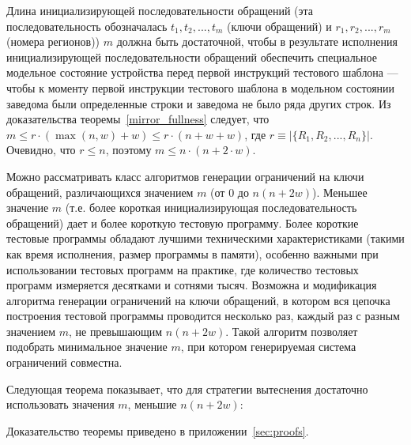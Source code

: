 Длина инициализирующей последовательности обращений (эта последовательность обозначалась $t_1, t_2, ..., t_m$ (ключи обращений) и $r_1, r_2, ..., r_m$ (номера регионов)) $m$ должна быть достаточной, чтобы в результате исполнения инициализирующей последовательности обращений обеспечить специальное модельное состояние устройства перед первой инструкций тестового шаблона --- чтобы к моменту первой инструкции тестового шаблона в модельном состоянии заведома были определенные строки и заведома не было ряда других строк. Из доказательства теоремы~\ref{mirror_fullness} следует, что $m \leqslant r \cdot (\max(n,w) + w) \leqslant r \cdot (n + w + w)$, где $r \equiv |\{R_1, R_2, ..., R_n\}|$. Очевидно, что $r \leqslant n$, поэтому $m \leqslant n \cdot (n + 2\cdot w)$.

Можно рассматривать класс алгоритмов генерации ограничений на ключи обращений, различающихся значением $m$ (от 0 до $n(n+2w)$). Меньшее значение $m$ (т.е. более короткая инициализирующая последовательность обращений) дает и более короткую тестовую программу. Более короткие тестовые программы обладают лучшими техническими характеристиками (такими как время исполнения, размер программы в памяти), особенно важными при использовании тестовых программ на практике, где количество тестовых программ измеряется десятками и сотнями тысяч. Возможна и модификация алгоритма генерации ограничений на ключи обращений, в котором вся цепочка построения тестовой программы проводится несколько раз, каждый раз с разным значением $m$, не превышающим $n(n+2w)$. Такой алгоритм позволяет подобрать минимальное значение $m$, при котором генерируемая система ограничений совместна.

Следующая теорема показывает, что для стратегии вытеснения \LRU достаточно использовать значения $m$, меньшие $n(n+2w)$:

\begin{theorem}\label{thm_mirror_lenth_lru} \UpperBoundLRUMirror
\end{theorem}
Доказательство теоремы приведено в приложении~\ref{sec:proofs}.




